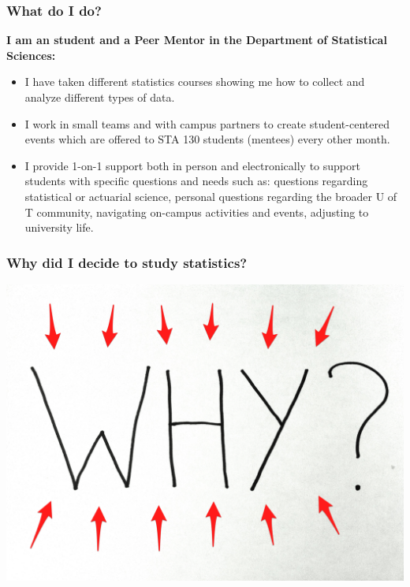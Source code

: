 \documentclass{beamer}
\begin{document}

\begin{frame}
\frametitle{ \textbf{What} do I do?}
\textbf{I am an student and a Peer Mentor in the Department of Statistical Sciences:}\\
\begin{itemize}
	\item I have taken different statistics courses showing me how to collect and analyze different types of data.
	\item I work in small teams and with campus partners to create student-centered events which are offered to STA 130 students (mentees) every other month.
	\item I provide 1-on-1 support both in person and electronically to support students with specific questions and needs such as: questions regarding statistical or actuarial science, personal questions regarding the broader U of T community, navigating on-campus activities and events, adjusting to university life.
\end{itemize}
\end{frame}



\begin{frame}
\frametitle{\textbf{Why} did I decide to study statistics?}
\begin{center}
	\includegraphics[width=0.4\linewidth]{why222.jpg}
	\begin{figure}[H]
	\end{figure}
\end{center}

\end{frame}


\end{document}
